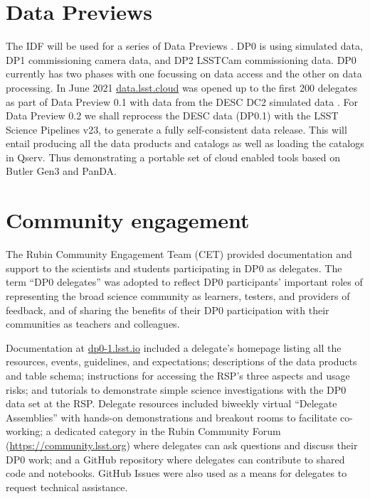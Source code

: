 \section {Data Previews}
The IDF will be used for a series of Data Previews \citep[DP;][]{RDO-011}. DP0 is using simulated data, DP1 commissioning camera data,
and DP2 LSSTCam commissioning data. DP0 currently has two phases\citep{RTN-001} with one focussing on data access and the other on data processing.
In June 2021 \href{https://data.lsst.cloud}{data.lsst.cloud} was opened up to the first 200 delegates as part of Data Preview 0.1 with data from the DESC DC2 simulated data \citep{arXiv:2010.05926}.
For Data Preview 0.2 we shall reprocess the DESC data (DP0.1) with the LSST Science Pipelines v23, to generate a fully self-consistent data release.
This will entail producing all the data products and catalogs as well as loading the  catalogs in Qserv.
Thus demonstrating a portable set of cloud enabled tools based on Butler Gen3 \citep{2019ASPC..523..653J} and PanDA.

\section{Community engagement }
The Rubin Community Engagement Team (CET) provided documentation and support to the scientists and students participating in DP0 as delegates.
The term ``DP0 delegates'' was adopted to reflect DP0 participants’ important roles of representing the broad science community as learners, testers, and providers of feedback, and of sharing the benefits of their DP0 participation with their communities as teachers and colleagues.

Documentation at \href{https://dp0-1.lsst.io}{dp0-1.lsst.io} included a delegate's homepage listing all the resources, events, guidelines, and expectations; descriptions of the data products and table schema; instructions for accessing the RSP's three aspects and usage risks; and tutorials to demonstrate simple science investigations with the DP0 data set at the RSP.
Delegate resources included biweekly virtual ``Delegate Assemblies'' with hands-on demonstrations and breakout rooms to facilitate co-working; a dedicated category in the Rubin Community Forum (\url{https://community.lsst.org}) where delegates can ask questions and discuss their DP0 work; and a GitHub repository where delegates can contribute to shared code and notebooks.
GitHub Issues were also used as a means for delegates to request technical assistance.


